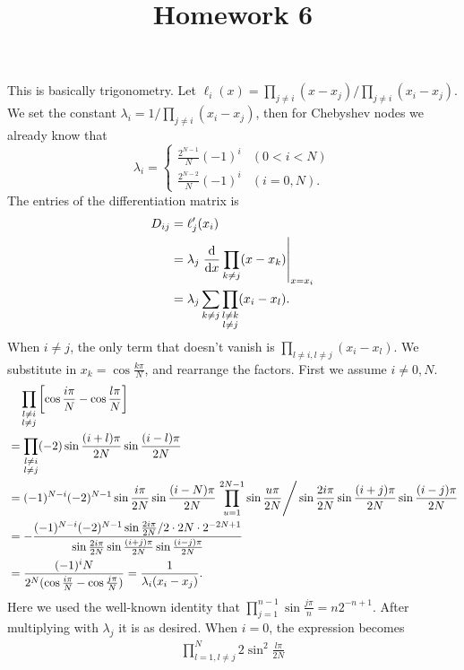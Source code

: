 \documentclass{homework}
\title{Homework 6}
\begin{document}
\maketitle

\begin{problem} This is basically trigonometry.
Let \(\ell_i(x) = \prod_{j\ne i} (x-x_j)/\prod_{j\ne i}(x_i-x_j)\). We set the constant \(\lambda_i = 1/\prod_{j\ne i}(x_i - x_j)\), then for Chebyshev nodes we already know that
\[\lambda_i = \begin{cases}
\frac{2^{N-1}}{N}(-1)^i & (0 < i < N)\\
\frac{2^{N-2}}{N}(-1)^i & (i = 0, N).
\end{cases}\]
The entries of the differentiation matrix is
\begin{align*}
D_{ij} &= \ell'_j(x_i)\\
&= \lambda_j \left. \frac{\d}{\d[x]} \prod_{k\ne j} (x - x_k) \right|_{x = x_i}\\
&= \lambda_j \sum_{k \ne j}\prod_{\substack{l \ne k\\l\ne j}} (x_i - x_l).
\end{align*}
When \(i\ne j\), the only term that doesn't vanish is \(\prod_{l\ne i, l\ne j} (x_i - x_l)\). We substitute in \(x_k = \cos \frac{k\pi}{N}\), and rearrange the factors. First we assume \(i\ne 0,N\).
\begin{align*}
&\quad \prod_{\substack{l\ne i\\l\ne j}} \left[\cos \frac{i\pi}{N} - \cos\frac{l\pi}{N}\right]\\
&= \prod_{\substack{l\ne i\\l\ne j}} (-2)\sin\frac{(i+l)\pi}{2N}\sin\frac{(i-l)\pi}{2N}\\
&= (-1)^{N-i}(-2)^{N-1} \sin\frac{i\pi}{2N}\sin\frac{(i-N)\pi}{2N}\left.\prod_{u=1}^{2N-1} \sin \frac{u\pi}{2N} \right/ \sin\frac{2i\pi}{2N} \sin\frac{(i+j)\pi}{2N}\sin\frac{(i-j)\pi}{2N}\\
&=-\frac{(-1)^{N-i}(-2)^{N-1} \sin\frac{2i\pi}{2N}/2 \cdot 2N \cdot 2^{-2N+1}}{\sin\frac{2i\pi}{2N} \sin\frac{(i+j)\pi}{2N}\sin\frac{(i-j)\pi}{2N}}\\
&= \frac{(-1)^{i}N}{2^{N} (\cos\frac{i\pi}{N} - \cos\frac{j\pi}{N})} = \frac{1}{\lambda_i(x_i - x_j)}.
\end{align*}
Here we used the well-known identity that \(\prod_{j=1}^{n-1}\sin\frac{j\pi}{n} = n2^{-n+1}\). After multiplying with \(\lambda_j\) it is as desired. When \(i = 0\), the expression becomes
\begin{align*}
\prod_{l=1, l\ne j}^{N} 2 \sin^2\frac{l\pi}{2N}

\end{align*}
\end{problem}
\end{document}

